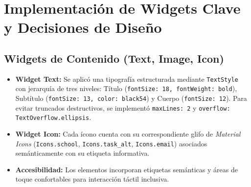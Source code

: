 \documentclass[12pt,a4paper]{article}
\begin{document}
\section{Implementación de Widgets Clave y Decisiones de Diseño}

\subsection{Widgets de Contenido (Text, Image, Icon)}
\begin{itemize}[leftmargin=*]
    \item \textbf{Widget Text:} Se aplicó una tipografía estructurada mediante \texttt{TextStyle} con jerarquía de tres niveles: Título (\texttt{fontSize: 18, fontWeight: bold}), Subtítulo (\texttt{fontSize: 13, color: black54}) y Cuerpo (\texttt{fontSize: 12}). Para evitar truncados destructivos, se implementó \texttt{maxLines: 2} y \texttt{overflow: TextOverflow.ellipsis}.
    \item \textbf{Widget Icon:} Cada ícono cuenta con su correspondiente glifo de \textit{Material Icons} (\texttt{Icons.school}, \texttt{Icons.task\_alt}, \texttt{Icons.email}) asociados semánticamente con su etiqueta informativa.
    \item \textbf{Accesibilidad:} Los elementos incorporan etiquetas semánticas y áreas de toque confortables para interacción táctil inclusiva.
\end{itemize}
\end{document}
